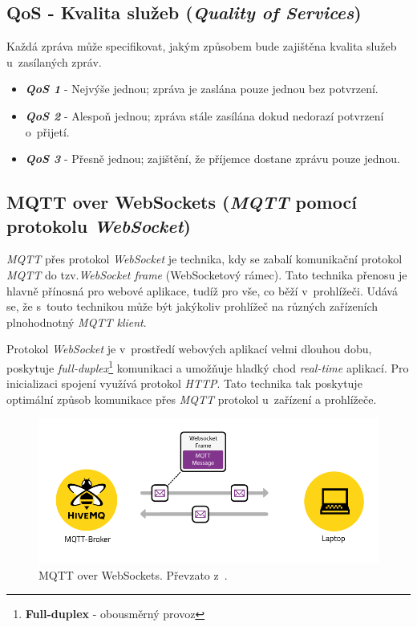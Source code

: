 \newpage
\subsection*{QoS - Kvalita služeb (\emph{Quality of Services})}
Každá zpráva může specifikovat, jakým způsobem bude zajištěna kvalita služeb u~zasílaných zpráv.~\cite{wiki:mqtt}
\begin{itemize}
  \item \textbf{\emph{QoS 1}} - Nejvýše jednou; zpráva je zaslána pouze jednou bez potvrzení.
  \item \textbf{\emph{QoS 2}} - Alespoň jednou; zpráva stále zasílána dokud nedorazí potvrzení o~přijetí.
  \item \textbf{\emph{QoS 3}} - Přesně jednou; zajištění, že příjemce dostane zprávu pouze jednou.
\end{itemize}

\subsection*{MQTT over WebSockets (\emph{MQTT} pomocí protokolu \emph{WebSocket})}
\label{mqtt:websockets}
\emph{MQTT} přes protokol \emph{WebSocket} je technika, kdy se zabalí komunikační protokol \emph{MQTT} do tzv.\emph{WebSocket frame} (WebSocketový rámec).
Tato technika přenosu je hlavně přínosná pro webové aplikace, tudíž pro vše, co běží v~prohlížeči.
Udává se, že s~touto technikou může být jakýkoliv prohlížeč na různých zařízeních plnohodnotný \emph{MQTT klient}.~\cite{mqtt:hivemq}

Protokol \emph{WebSocket} je v~prostředí webových aplikací velmi dlouhou dobu, poskytuje \emph{full-duplex}\footnote{\textbf{Full-duplex} - obousměrný provoz} komunikaci a umožňuje hladký chod \emph{real-time} aplikací.
Pro inicializaci spojení využívá protokol \emph{HTTP}.
Tato technika tak poskytuje optimální způsob komunikace přes \emph{MQTT} protokol u~zařízení a prohlížeče.

\begin{figure}[ht]
  \centering
  \includegraphics[width=1 \linewidth]{obrazky-figures/mqtt_websocket.png}
  \caption{MQTT over WebSockets. Převzato z~\cite{mqtt:hivemq}.}
  \label{figure:mqtt_websockets}
\end{figure}

